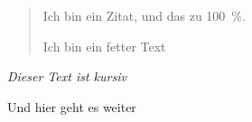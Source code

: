 \documentclass[a4paper]{article}
\begin{document}
\begin{quotation}
	Ich bin ein Zitat, und das zu 100 \,\%.

	\begin{bfseries}
		Ich bin ein fetter Text
	\end{bfseries}

\end{quotation}

\textit{Dieser Text ist kursiv}

Und hier geht es weiter
\end{document}
